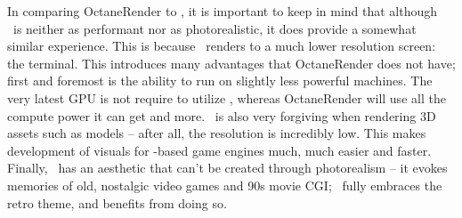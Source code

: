 In comparing OctaneRender to \name, it is important to keep in mind that although \name\ is neither as performant nor as photorealistic, it does provide a somewhat similar experience.
This is because \name\ renders to a much lower resolution screen: the terminal.
This introduces many advantages that OctaneRender does not have; first and foremost is the ability to run on slightly less powerful machines.
The very latest GPU is not require to utilize \name, whereas OctaneRender will use all the compute power it can get and more.
\name\ is also very forgiving when rendering 3D assets such as models -- after all, the resolution is incredibly low.
This makes development of visuals for \name-based game engines much, much easier and faster.
Finally, \name\ has an aesthetic that can't be created through photorealism -- it evokes memories of old, nostalgic video games and 90s movie CGI; \name\ fully embraces the retro theme, and benefits from doing so.
